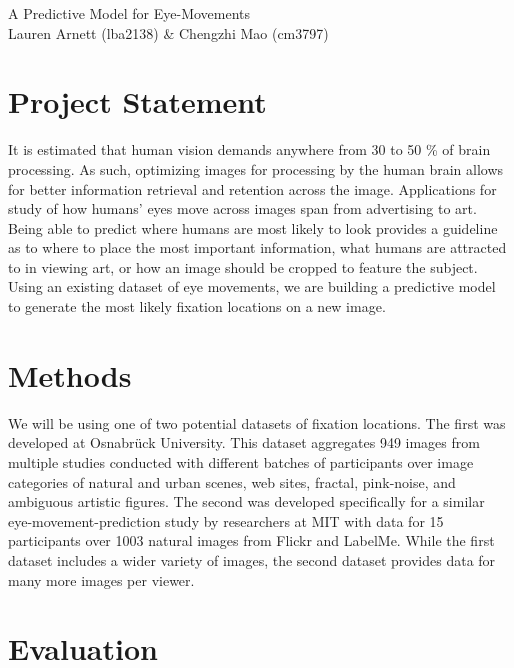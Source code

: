 \documentclass[11pt]{article}
\begin{document}
\begin{center}
    \LARGE {A Predictive Model for Eye-Movements}
    \\\large Lauren Arnett (lba2138) \& Chengzhi Mao (cm3797)
    
\end{center}
\section{Project Statement} 
\vspace{-0.25cm}
It is estimated that human vision demands anywhere from 30 to 50 \% of brain
processing. As such, optimizing images for processing by the human brain allows
for better information retrieval and retention across the image. Applications
for study of how humans' eyes move across images span from advertising to art.
Being able to predict where humans are most likely to look provides a guideline
as to where to place the most important information, what humans are attracted
to in viewing art, or how an image should be cropped to feature the subject.
Using an existing dataset of eye movements, we are building a predictive model
to generate the most likely fixation locations on a new image.
\vspace{-0.5cm}
\section{Methods} 
\vspace{-0.25cm}
We will be using one of two potential datasets of fixation locations. The first
was developed at Osnabr{\"u}ck University. This dataset aggregates 949 images
from multiple studies conducted with different batches of participants over
image categories of natural and urban scenes, web sites, fractal, pink-noise,
and ambiguous artistic figures.  The second was developed specifically for
a similar eye-movement-prediction study by researchers at MIT with data for 15
participants over 1003 natural images from Flickr and LabelMe. While the first
dataset includes a wider variety of images, the second dataset provides data
for many more images per viewer.

\vspace{-0.5cm}
\section{Evaluation}
\vspace{-0.25cm}
\end{document}
